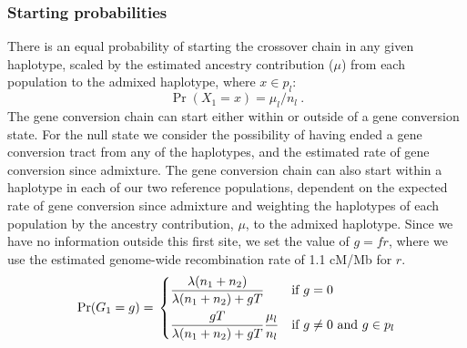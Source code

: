\subsubsection*{Starting probabilities}
There is an equal probability of starting the crossover chain in any given haplotype, scaled by the estimated ancestry contribution ($\mu$) from each population to the admixed haplotype, where $x \in p_l$:
\begin{equation} \Pr(X_1 = x) = 
        \mu_l/n_l ~.
\end{equation}
The gene conversion chain can start either within or outside of a gene conversion state.
For the null state we consider the possibility of having ended a gene conversion tract from any of the haplotypes, and the estimated rate of gene conversion since admixture.
The gene conversion chain can also start within a haplotype in each of our two reference populations, dependent on the expected rate of gene conversion since admixture and weighting the haplotypes of each population by the ancestry contribution, $\mu$, to the admixed haplotype.
Since we have no information outside this first site, we set the value of $g = f r$, where we use the estimated genome-wide recombination rate of 1.1 cM/Mb for $r$.
\begin{equation} 
\Pr(G_1 = g) =  \\
\begin{dcases}
    \frac{\lambda (n_1+n_2) }{ \lambda (n_1+n_2) + g T }
& \text{if $g = 0$} \\
    \frac{ g  T }{ \lambda (n_1+n_2) + g T } \frac{\mu_l}{n_l}
& \text{if $g \ne 0$ and $g \in p_l$} \\
\end{dcases}
\end{equation}



